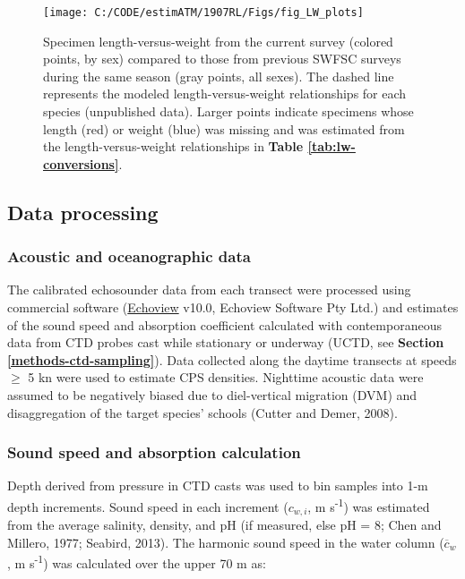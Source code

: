\documentclass[]{article}
\begin{document}
\begin{figure}[H]

{\centering \texttt{[image: C:/CODE/estimATM/1907RL/Figs/fig\_LW\_plots]} 

}

\caption{Specimen length-versus-weight from the current survey (colored points, by sex) compared to those from previous SWFSC surveys during the same season (gray points, all sexes). The dashed line represents the modeled length-versus-weight relationships for each species (unpublished data). Larger points indicate specimens whose length (red) or weight (blue) was missing and was estimated from the length-versus-weight relationships in \textbf{Table \ref{tab:lw-conversions}}.}\label{fig:lw-plot}
\end{figure}

\newpage

\hypertarget{methods-data-processing}{%
\subsection{Data processing}\label{methods-data-processing}}

\hypertarget{methods-acoustic-processing}{%
\subsubsection{Acoustic and oceanographic data}\label{methods-acoustic-processing}}

The calibrated echosounder data from each transect were processed using commercial software (\href{https://www.echoview.com/}{Echoview} v10.0, Echoview Software Pty Ltd.) and estimates of the sound speed and absorption coefficient calculated with contemporaneous data from CTD probes cast while stationary or underway (UCTD, see \textbf{Section \ref{methods-ctd-sampling}}). Data collected along the daytime transects at speeds \(\geq\) 5 kn were used to estimate CPS densities. Nighttime acoustic data were assumed to be negatively biased due to diel-vertical migration (DVM) and disaggregation of the target species' schools (Cutter and Demer, 2008).

\hypertarget{methods-sound-calcs}{%
\subsubsection{Sound speed and absorption calculation}\label{methods-sound-calcs}}

Depth derived from pressure in CTD casts was used to bin samples into 1-m depth increments. Sound speed in each increment (\(c_{w,i}\), m s\textsuperscript{-1}) was estimated from the average salinity, density, and pH (if measured, else pH = 8; Chen and Millero, 1977; Seabird, 2013). The harmonic sound speed in the water column (\(\overline{c}_w\), m s\textsuperscript{-1}) was calculated over the upper 70 m as:
\end{document}

